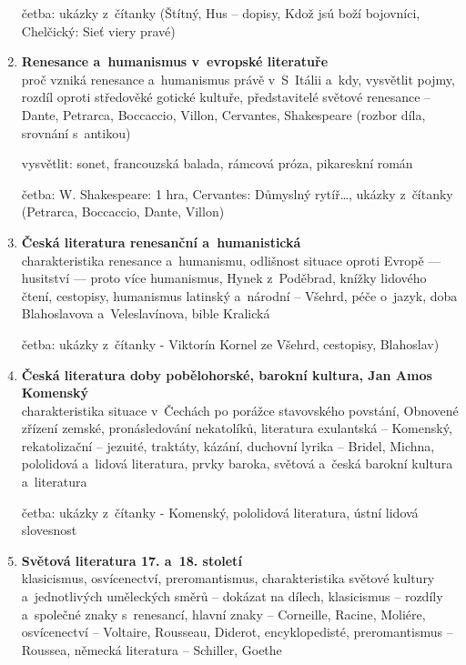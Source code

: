 \begin{enumerate}
četba: ukázky z~čítanky (Štítný, Hus -- dopisy, Kdož jsú boží bojovníci, 
Chelčický: Sieť viery pravé)
     
\item \textbf{Renesance a~humanismus v~evropské literatuře} \\
proč vzniká renesance a~humanismus právě v~S~Itálii  a~kdy, vysvětlit
pojmy, rozdíl oproti středověké gotické kultuře, představitelé světové
renesance -- Dante, Petrarca, Boccaccio, Villon, Cervantes, Shakespeare
(rozbor díla, srovnání s~antikou)

vysvětlit: sonet, francouzská balada, rámcová próza, pikareskní román

četba: W. Shakespeare: 1 hra, Cervantes: Důmyslný rytíř\dots, ukázky
z~čítanky (Petrarca, Boccaccio, Dante, Villon)

\item \textbf{Česká literatura renesanční a~humanistická} \\
charakteristika renesance a~humanismu, odlišnost situace oproti Evropě ---
husitství --- proto více humanismus, Hynek z~Poděbrad, knížky lidového
čtení, cestopisy, humanismus latinský a~národní -- Všehrd, péče
o~jazyk, doba Blahoslavova a~Veleslavínova, bible Kralická

četba: ukázky z~čítanky - Viktorín Kornel ze Všehrd, cestopisy, Blahoslav)
     
\item \textbf{Česká literatura doby pobělohorské, barokní kultura, Jan Amos Komenský} \\
charakteristika situace v~Čechách po porážce stavovského povstání, 
Obnovené zřízení zemské, pronásledování nekatolíků, literatura
exulantská -- Komenský, rekatolizační -- jezuité, traktáty, kázání, 
duchovní lyrika -- Bridel, Michna, pololidová a~lidová literatura, 
prvky baroka, světová a~česká barokní kultura a~literatura

četba: ukázky z~čítanky - Komenský, pololidová literatura, ústní lidová
slovesnost 

\item \textbf{Světová literatura 17. a~18. století} \\
klasicismus, osvícenectví, preromantismus, charakteristika světové
kultury a~jednotlivých uměleckých směrů -- dokázat na dílech, klasicismus
-- rozdíly a~společné znaky s~renesancí, hlavní znaky -- Corneille, 
Racine, Moliére, osvícenectví -- Voltaire, Rousseau, Diderot, 
encyklopedisté, preromantismus -- Roussea, německá literatura -- Schiller, 
Goethe


\end{enumerate}
